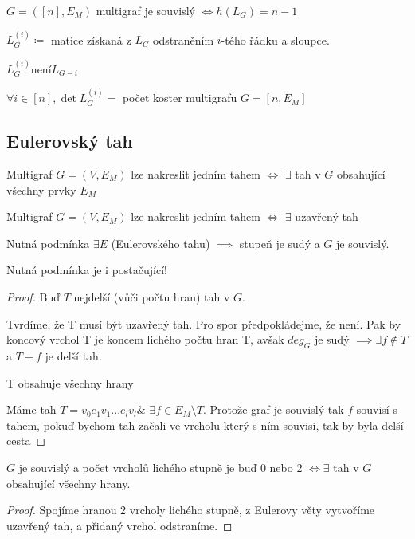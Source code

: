 \documentclass[../main.tex]{subfiles}
\begin{document}
\begin{claim}
    $G=([n], E_M)$ multigraf je souvislý $\Leftrightarrow h(L_G) = n-1$ 
\end{claim}


\begin{definition}
    $L_G^{(i)} \coloneq $ matice získaná z $L_G$ odstraněním $i$-tého řádku a sloupce.
\end{definition}

\begin{claim}
    $L_G^{(i)} $není$ L_{G-i}$
\end{claim}

\begin{theorem}
    $\forall i \in [n], \det L_G^{(i)} = $ počet koster multigrafu $G = [n, E_M]$
\end{theorem}

\subsection{Eulerovský tah}

\begin{definition}
    Multigraf $G=(V,E_M)$ lze nakreslit jedním tahem $\Leftrightarrow$ $\exists$ tah v $G$ obsahující všechny prvky $E_M$    
\end{definition}


\begin{definition}
    Multigraf $G=(V,E_M)$ lze nakreslit jedním tahem $\Leftrightarrow$ $\exists$ uzavřený tah    
\end{definition}

\begin{claim}
    Nutná podmínka $\exists E$ (Eulerovského tahu) $\implies$ stupeň je sudý a $G$ je souvislý. 
\end{claim}

\begin{theorem}[Eulerova]
    Nutná podmínka je i postačující!
\end{theorem}

\begin{proof}
    Buď $T$ nejdelší (vůči počtu hran) tah v $G$.

    Tvrdíme, že T musí být uzavřený tah. Pro spor 
    předpokládejme, že není. Pak by koncový vrchol T je koncem 
    lichého počtu hran T, avšak $deg_G$ je sudý $\implies \exists f \notin T$ a $T+f$ je delší tah.
    
    T obsahuje všechny hrany

    Máme tah $T=v_0 e_1 v_1 ... e_l v_l$\& $\exists f \in E_M\setminus T$. 
    Protože graf je souvislý tak $f$ souvisí s tahem, pokuď bychom tah začali ve vrcholu který s ním souvisí, tak by byla delší cesta
\end{proof}


\begin{corollary}
    $G$ je souvislý a počet vrcholů lichého stupně je buď 0 nebo 2 $\Leftrightarrow \exists $ tah v $G$ obsahující všechny hrany. 
\end{corollary}

\begin{proof}
    Spojíme hranou 2 vrcholy lichého stupně, z Eulerovy věty vytvoříme uzavřený tah, a přidaný vrchol odstraníme.
\end{proof}
\end{document}
